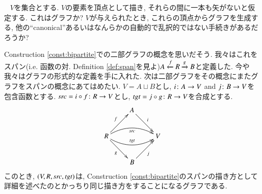 \begin{exercise}~
\sexc $V$を集合とする. $V$の要素を頂点として描き, それらの間に一本も矢がないと仮定する. これはグラフか?
\next $V$が与えられたとき, これらの頂点からグラフを生成する, 他の``canonical''あるいはなんらかの自動的で乱択的ではない手続きがあるだろうか?
\endsexc
\end{exercise}

\begin{example}


Construction \ref{const:bipartite}での二部グラフの概念を思いだそう. 我々はこれをスパン(i.e. 函数の対. Definition \ref{def:span}を見よ)$A\xleftarrow{f}R\xrightarrow{g}B$と定義した. 今や我々はグラフの形式的な定義を手に入れた. 次は二部グラフをその概念にまたグラフをスパンの概念にあてはめたい. $V=A\sqcup B$とし, $i\colon A\rightarrow V$ and $j\colon B\rightarrow V$を包含函数とする. $\operatorname{\mathit{src}}=i\circ f\colon R\rightarrow V$とし, $\operatorname{\mathit{tgt}}=j\circ g\colon R\rightarrow V$を合成とする.
$$
\xymatrix{&A\ar[dr]^i\\R\ar@/^1pc/[rr]_{\src}\ar@/_1pc/[rr]^{\tgt}\ar[ur]^f\ar[dr]_g&&V\\&B\ar[ur]_j}
$$ 
このとき, $(V,R,\operatorname{\mathit{src}},\operatorname{\mathit{tgt}})$は, Construction \ref{const:bipartite}のスパンの描き方として詳細を述べたのとかっちり同じ描き方をすることになるグラフである.

\end{example}

